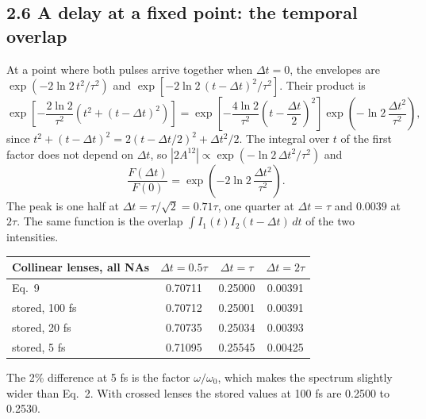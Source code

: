 \documentclass[10pt]{article}
\begin{document}
\subsection*{2.6 A delay at a fixed point: the temporal overlap}
At a point where both pulses arrive together when $\Delta t = 0$, the envelopes are
$\exp(-2\ln 2\,t^2/\tau^2)$ and $\exp[-2\ln 2\,(t-\Delta t)^2/\tau^2]$. Their product is
\begin{equation}\exp\!\left[-\frac{2\ln 2}{\tau^2}\left(t^2 + (t-\Delta t)^2\right)\right]
= \exp\!\left[-\frac{4\ln 2}{\tau^2}\left(t-\frac{\Delta t}{2}\right)^2\right]
\exp\!\left(-\ln 2\,\frac{\Delta t^2}{\tau^2}\right),\end{equation}
since $t^2 + (t-\Delta t)^2 = 2(t-\Delta t/2)^2 + \Delta t^2/2$. The integral over $t$ of the first factor does
not depend on $\Delta t$, so $|2A^{12}| \propto \exp(-\ln 2\,\Delta t^2/\tau^2)$ and
\begin{equation}\frac{F(\Delta t)}{F(0)} = \exp\!\left(-2\ln 2\,\frac{\Delta t^2}{\tau^2}\right).\end{equation}
The peak is one half at $\Delta t = \tau/\sqrt2 = 0.71\tau$, one quarter at $\Delta t = \tau$ and $0.0039$ at
$2\tau$. The same function is the overlap $\int I_1(t)I_2(t-\Delta t)\,dt$ of the two intensities.
\begin{center}\small\begin{tabular}{lccc}\toprule
Collinear lenses, all NAs & $\Delta t = 0.5\tau$ & $\Delta t = \tau$ & $\Delta t = 2\tau$\\\midrule
Eq.~9 & 0.70711 & 0.25000 & 0.00391\\
stored, 100 fs & 0.70712 & 0.25001 & 0.00391\\
stored, 20 fs & 0.70735 & 0.25034 & 0.00393\\
stored, 5 fs & 0.71095 & 0.25545 & 0.00425\\\bottomrule\end{tabular}\end{center}
The 2\% difference at 5 fs is the factor $\omega/\omega_0$, which makes the spectrum slightly wider than Eq.~2. With
crossed lenses the stored values at 100 fs are 0.2500 to 0.2530.
\end{document}
